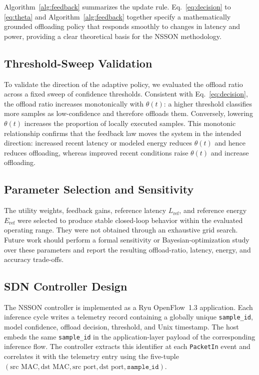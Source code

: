 \documentclass[journal]{IEEEtran}
\begin{document}
Algorithm~\ref{alg:feedback} summarizes the update rule. Eq.~\eqref{eq:decision} to \eqref{eq:theta} and Algorithm~\ref{alg:feedback} together specify a mathematically grounded offloading policy that responds smoothly to changes in latency and power, providing a clear theoretical basis for the NSSON methodology.



\subsection{Threshold-Sweep Validation}
\label{sec:thresholdsweep}

To validate the direction of the adaptive policy, we evaluated the offload ratio across a fixed sweep of confidence thresholds. Consistent with Eq.~\eqref{eq:decision}, the offload ratio increases monotonically with $\theta(t)$: a higher threshold classifies more samples as low-confidence and therefore offloads them. Conversely, lowering $\theta(t)$ increases the proportion of locally executed samples. This monotonic relationship confirms that the feedback law moves the system in the intended direction: increased recent latency or modeled energy reduces $\theta(t)$ and hence reduces offloading, whereas improved recent conditions raise $\theta(t)$ and increase offloading.

\subsection{Parameter Selection and Sensitivity}
\label{sec:parameters}

The utility weights, feedback gains, reference latency $L_{\mathrm{ref}}$, and reference energy $E_{\mathrm{ref}}$ were selected to produce stable closed-loop behavior within the evaluated operating range. They were not obtained through an exhaustive grid search. Future work should perform a formal sensitivity or Bayesian-optimization study over these parameters and report the resulting offload-ratio, latency, energy, and accuracy trade-offs.

\subsection{SDN Controller Design}
\label{sec:sdndesign}

The NSSON controller is implemented as a Ryu OpenFlow~1.3 application. Each inference cycle writes a telemetry record containing a globally unique \texttt{sample\_id}, model confidence, offload decision, threshold, and Unix timestamp. The host embeds the same \texttt{sample\_id} in the application-layer payload of the corresponding inference flow. The controller extracts this identifier at each \texttt{PacketIn} event and correlates it with the telemetry entry using the five-tuple $(\text{src MAC}, \text{dst MAC}, \text{src port}, \text{dst port}, \texttt{sample\_id})$.
\end{document}
